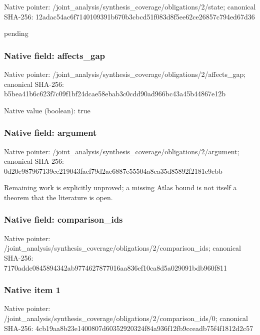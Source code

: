 \documentclass[10pt,a4paper]{article}
\begin{document}
Native pointer: /joint\_analysis/synthesi\allowbreak{}s\_coverage/obligations/2\allowbreak{}/state; canonical SHA-256: 12adac54ac6f7140109391b6\allowbreak{}70b3cbcd51f083d8f5ee62ce\allowbreak{}26857c794ed67d36


pending


\subsubsection{Native field: affects\_gap}


Native pointer: /joint\_analysis/synthesi\allowbreak{}s\_coverage/obligations/2\allowbreak{}/affects\_gap; canonical SHA-256: b5bea41b6c623f7c09f1bf24\allowbreak{}dcae58ebab3c0cdd90ad966b\allowbreak{}c43a45b44867e12b



Native value (boolean): true



\subsubsection{Native field: argument}


Native pointer: /joint\_analysis/synthesi\allowbreak{}s\_coverage/obligations/2\allowbreak{}/argument; canonical SHA-256: 0d20e987967139ce219043fa\allowbreak{}ef79d2ae6887e55504a8ea35\allowbreak{}d85892f2181c9cbb


Remaining work is explicitly unproved; a missing Atlas bound is not itself a theorem that the literature is open.


\subsubsection{Native field: comparison\_ids}


Native pointer: /joint\_analysis/synthesi\allowbreak{}s\_coverage/obligations/2\allowbreak{}/comparison\_ids; canonical SHA-256: 7170addc0845894342ab9774\allowbreak{}627877016aa836ef10ca8d5a\allowbreak{}029091bdb960f811



\subsubsection{Native item 1}


Native pointer: /joint\_analysis/synthesi\allowbreak{}s\_coverage/obligations/2\allowbreak{}/comparison\_ids/0; canonical SHA-256: 4cb19aa8b23e1400807d6035\allowbreak{}2920324f84a936f12fb9ccea\allowbreak{}db75f4f1812d2c57
\end{document}
